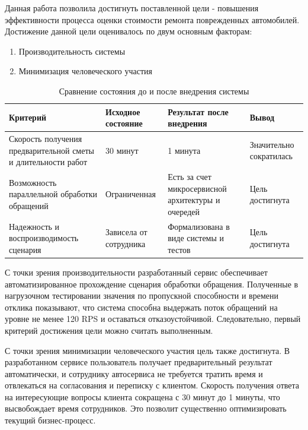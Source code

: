 
Данная работа позволила достигнуть поставленной цели - повышения эффективности процесса оценки стоимости ремонта поврежденных автомобилей. Достижение данной цели оценивалось по двум основным факторам:
\begin{enumerate}[label=\arabic*.]
  \item Производительность системы
  \item Минимизация человеческого участия
\end{enumerate}

\begin{table}[h!]
\caption{Сравнение состояния до и после внедрения системы}
\centering
\begin{tabular}{|p{5cm}|p{3cm}|p{5cm}|p{3cm}|}
\hline
\textbf{Критерий} & \textbf{Исходное состояние} & \textbf{Результат после внедрения} & \textbf{Вывод} \\
\hline
Скорость получения предварительной сметы и длительности работ & 30 минут & 1 минута & Значительно сократилась \\
\hline
Возможность параллельной обработки обращений & Ограниченная & Есть за счет микросервисной архитектуры и очередей & Цель достигнута \\
\hline
Надежность и воспроизводимость сценария & Зависела от сотрудника & Формализована в виде системы и тестов & Цель достигнута \\
\hline
\end{tabular}
\end{table}

С точки зрения производительности разработанный сервис обеспечивает автоматизированное прохождение сценария обработки обращения. Полученные в нагрузочном тестировании значения по пропускной способности и времени отклика показывают, что система способна выдержать поток обращений на уровне не менее 120 RPS и оставаться отказоустойчивой. Следовательно, первый критерий достижения цели можно считать выполненным.

С точки зрения минимизации человеческого участия цель также достигнута. В разработанном сервисе пользователь получает предварительный результат автоматически, и сотруднику автосервиса не требуется тратить время и отвлекаться на согласования и переписку с клиентом. Скорость получения ответа на интересующие вопросы клиента сокращена с 30 минут до 1 минуты, что высвобождает время сотрудников. Это позволит существенно оптимизировать текущий бизнес-процесс.

